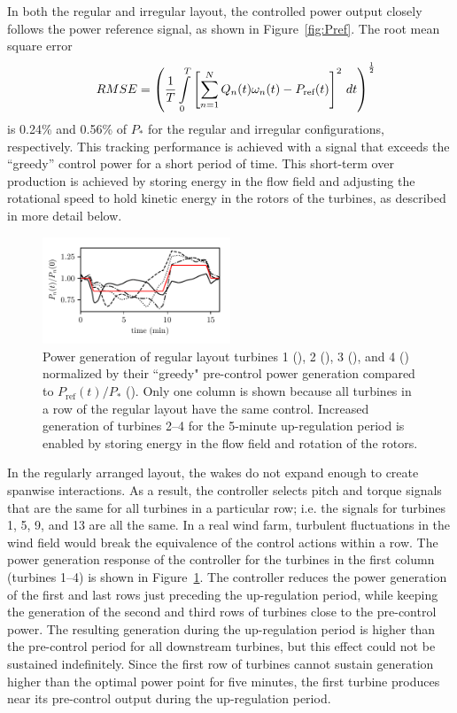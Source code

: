 In both the regular and irregular layout, the controlled power output closely follows the power reference signal, as shown in Figure~\ref{fig:Pref}. The root mean square error
\begin{equation}
RMSE = \left(\frac{1}{T} \int\displaylimits_0^T \left[\sum_{n=1}^N Q_n(t) \omega_n(t) - P_\text{ref}(t)\right]^2 \, dt\right)^\frac{1}{2} \hspace{-1em}
\end{equation}
is 0.24\% and 0.56\% of $P_*$ for the regular and irregular configurations, respectively. This tracking performance is achieved with a signal that exceeds the ``greedy'' control power for a short period of time. This short-term over production is achieved by storing energy in the flow field and adjusting the rotational speed to hold kinetic energy in the rotors of the turbines, as described in more detail below.


\begin{figure}[thpb]
\centering
\includegraphics[width=0.5\textwidth]{./fig/Pnorm.pdf}
\vspace{-1.75em}
\caption{Power generation of regular layout turbines 1 (\full), 2 (\broken), 3 (\dashed), and 4 (\dashdot) normalized by their ``greedy" pre-control power generation compared to $P_\text{ref}(t)/P_*$ ({\color{red}\full}). Only one column is shown because all turbines in a row of the regular layout have the same control. Increased generation of turbines 2--4 for the 5-minute up-regulation period is enabled by storing energy in the flow field and rotation of the rotors.}
\label{fig:Pnorm}
\end{figure}

In the regularly arranged layout, the wakes do not expand enough to create spanwise interactions. As a result, the controller selects pitch and torque signals that are the same for all turbines in a particular row; i.e. the signals for turbines 1, 5, 9, and 13 are all the same. In a real wind farm, turbulent fluctuations in the wind field would break the equivalence of the control actions within a row. The power generation response of the controller for the turbines in the first column (turbines 1--4) is shown in Figure~\ref{fig:Pnorm}. The controller reduces the power generation of the first and last rows just preceding the up-regulation period, while keeping the generation of the second and third rows of turbines close to the pre-control power. The resulting generation during the up-regulation period is higher than the pre-control period for all downstream turbines, but this effect could not be sustained indefinitely. Since the first row of turbines cannot sustain generation higher than the optimal power point for five minutes, the first turbine produces near its pre-control output during the up-regulation period.

